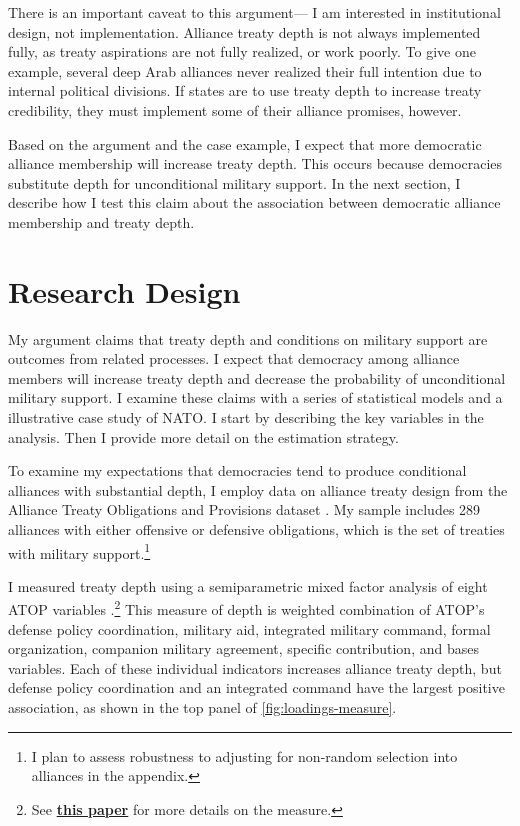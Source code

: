 \documentclass[12pt]{article}
\begin{document}
There is an important caveat to this argument--- I am interested in institutional design, not implementation.
Alliance treaty depth is not always implemented fully, as treaty aspirations are not fully realized, or work poorly. 
To give one example, several deep Arab alliances never realized their full intention due to internal political divisions.  
If states are to use treaty depth to increase treaty credibility, they must implement some of their alliance promises, however. 


Based on the argument and the case example, I expect that more democratic alliance membership will increase treaty depth. 
This occurs because democracies substitute depth for unconditional military support. 
In the next section, I describe how I test this claim about the association between democratic alliance membership and treaty depth. 




\section{Research Design}


My argument claims that treaty depth and conditions on military support are outcomes from related processes. 
I expect that democracy among alliance members will increase treaty depth and decrease the probability of unconditional military support. 
I examine these claims with a series of statistical models and a illustrative case study of NATO. 
I start by describing the key variables in the analysis. 
Then I provide more detail on the estimation strategy. 


To examine my expectations that democracies tend to produce conditional alliances with substantial depth, I employ data on alliance treaty design from the Alliance Treaty Obligations and Provisions dataset \citep{Leedsetal2002}. 
My sample includes 289 alliances with either offensive or defensive obligations, which is the set of treaties with military support.\footnote{I plan to assess robustness to adjusting for non-random selection into alliances in the appendix.} 


I measured treaty depth using a semiparametric mixed factor analysis of eight ATOP variables \citep{Murrayetal2013}.\footnote{See \textbf{\href{https://github.com/joshuaalley/arms-allies/blob/master/manuscript/arms-allies-paper.pdf}{this paper}} for more details on the measure.}
This measure of depth is weighted combination of ATOP's defense policy coordination, military aid, integrated military command, formal organization, companion military agreement, specific contribution, and bases variables. 
Each of these individual indicators increases alliance treaty depth, but defense policy coordination and an integrated command have the largest positive association, as shown in the top panel of \autoref{fig:loadings-measure}. 
\end{document}
